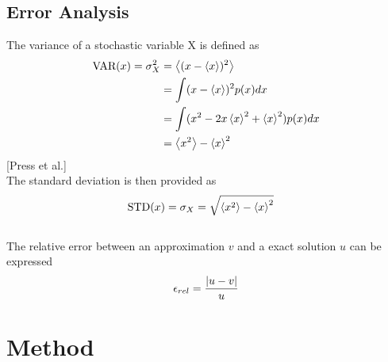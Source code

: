 \documentclass[%
reprint,nofootinbib,
amsmath,amssymb,
aps,
]{revtex4-1}
\begin{document}
\subsection*{Error Analysis}
\noindent 
The variance of a stochastic variable X is defined as\\
\begin{align}\label{var}
\textnormal{VAR}(x) = \sigma_X^2 &= \expval{(x-\expval{x})^2} \nonumber \\
&= \int(x-\expval{x})^2p(x)dx\nonumber\\
&= \int(x^2-2x\expval{x}^2+ \expval{x}^2)p(x)dx\nonumber\\
& = \expval{x^2} - \expval{x}^2 \nonumber \\ 
\end{align} 
\hspace{6.7cm}[Press et al.]  \\ 
The standard deviation is then provided as \\ 
\begin{align}\label{std}
	\textnormal{STD}(x) = \sigma_X &= \sqrt{\expval{x^2} - \expval{x}^2 \nonumber } 
\end{align} \\ 
The relative error between an approximation $v$ and a exact solution $u$ can be expressed  \\ 
\begin{equation}
	\epsilon_{rel} = \dfrac{\abs{u-v}}{u}
\end{equation}


\onecolumngrid
\newpage 
\section{Method} \noindent 
\twocolumngrid 
\noindent 
\end{document}
